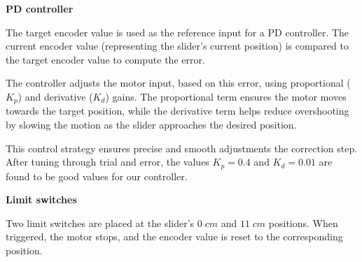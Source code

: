\documentclass[lettersize,journal]{IEEEtran}
\begin{document}

\medskip
\noindent\textbf{PD controller}

The target encoder value is used as the reference input for a PD controller. The current encoder value (representing the slider's current position) is compared to the target encoder value to compute the error. 

The controller adjusts the motor input, based on this error, using  proportional (\(K_p\)) and derivative (\(K_d\)) gains. The proportional term ensures the motor moves towards the target position, while the derivative term helps reduce overshooting by slowing the motion as the slider approaches the desired position. 

This control strategy ensures precise and smooth adjustments the correction step. After tuning through trial and error, the values $K_p = 0.4$ and $K_d = 0.01$ are found to be good values for our controller.



\medskip
\noindent\textbf{Limit switches}

Two limit switches are placed at the slider’s $0 \;cm$ and $11 \;cm$ positions. When triggered, the motor stops, and the encoder value is reset to the corresponding position.

\end{document}
